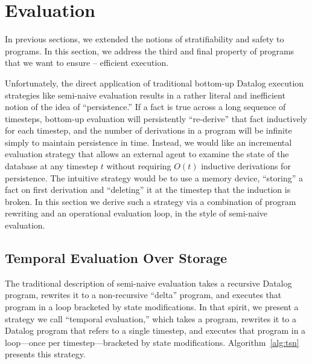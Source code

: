 \section{Evaluation}
In previous sections, we extended the notions of stratifiability and safety to \slang programs.  In this section, we address the third and final property of \slang programs that we want to ensure -- efficient execution.

Unfortunately, the direct application of traditional bottom-up Datalog
execution strategies like semi-naive evaluation results in a rather literal and
inefficient notion of the idea of ``persistence.''  If a fact is true across a
long sequence of timesteps, bottom-up evaluation will persistently
``re-derive'' that fact inductively for each timestep, and the number of
derivations in a program will be infinite simply to maintain persistence in
time.  Instead, we would like an incremental evaluation strategy that allows an
external agent to examine the state of the database at any timestep $t$ without
requiring $O(t)$ inductive derivations for persistence.  The intuitive strategy
would be to use a memory device, ``storing'' a fact on first derivation and
``deleting'' it at the timestep that the induction is broken.  In this section
we derive such a strategy via a combination of program rewriting and an
operational evaluation loop, in the style of semi-naive evaluation.

\subsection{Temporal Evaluation Over Storage}
The traditional description of semi-naive evaluation takes a recursive Datalog program, rewrites it to a non-recursive ``delta'' program, and executes that program in a loop bracketed by state modifications.  In that spirit, we present a strategy we call ``temporal evaluation,'' which takes a \slang program, rewrites it to a Datalog program that refers to a single timestep, and executes that program in a loop---once per timestep---bracketed by state modifications.  Algorithm~\ref{alg:tsn} presents this strategy.


